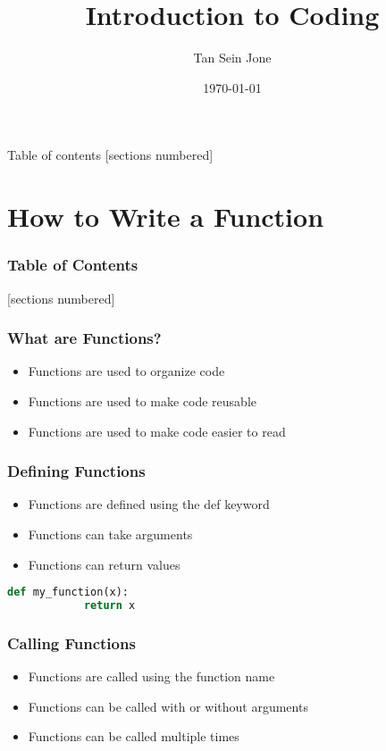 \documentclass[serif, 9pt, aspectratio=32]{beamer}
\title{Introduction to Coding}
\date{\today}
\author{Tan Sein Jone}
\institute{University of British Columbia}
\begin{document}
\maketitle

\begin{frame}{Table of contents}
    [sections numbered]
    \tableofcontents[hideallsubsections]
\end{frame}

\section{How to Write a Function}

\begin{frame}
    \frametitle{Table of Contents}
    [sections numbered]
    \tableofcontents[currentsection]
\end{frame}

\begin{frame}
    \centering
    \frametitle{What are Functions?}
    \begin{itemize}
        \setlength{\itemsep}{3em}
        \item Functions are used to organize code
        \item Functions are used to make code reusable
        \item Functions are used to make code easier to read
    \end{itemize}
\end{frame}

\begin{frame}
    \centering
    \frametitle{Defining Functions}
    \begin{itemize}
        \setlength{\itemsep}{3em}
        \item Functions are defined using the def keyword
        \item Functions can take arguments
        \item Functions can return values
    \end{itemize}
\end{frame}

\begin{frame}[fragile]
    \begin{lstlisting}[language=Python]
        def my_function(x):
            return x
    \end{lstlisting}
\end{frame}

\begin{frame}
    \centering
    \frametitle{Calling Functions}
    \begin{itemize}
        \setlength{\itemsep}{3em}
        \item Functions are called using the function name
        \item Functions can be called with or without arguments
        \item Functions can be called multiple times
    \end{itemize}
\end{frame}
\end{document}
